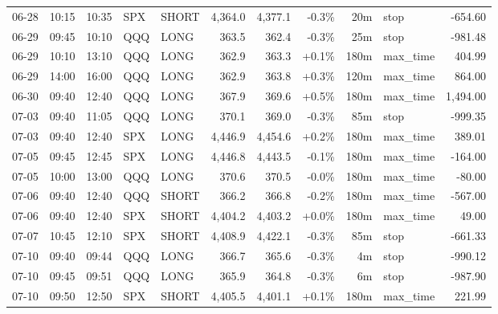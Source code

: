 \documentclass[11pt,a4paper,twoside]{article}
\begin{document}
\begin{center}
\begin{longtable}{>{\color{txtmain}}l l l l l r r r r >{\color{txtmain}}l r}
06-28 & 10:15 & 10:35 & SPX & SHORT & 4,364.0 & 4,377.1 & \textcolor{lossred}{-0.3\%} & 20m & stop & \textcolor{lossred}{-654.60} \\
06-29 & 09:45 & 10:10 & QQQ & LONG & 363.5 & 362.4 & \textcolor{lossred}{-0.3\%} & 25m & stop & \textcolor{lossred}{-981.48} \\
06-29 & 10:10 & 13:10 & QQQ & LONG & 362.9 & 363.3 & \textcolor{wingreen}{+0.1\%} & 180m & max\_time & \textcolor{wingreen}{404.99} \\
06-29 & 14:00 & 16:00 & QQQ & LONG & 362.9 & 363.8 & \textcolor{wingreen}{+0.3\%} & 120m & max\_time & \textcolor{wingreen}{864.00} \\
06-30 & 09:40 & 12:40 & QQQ & LONG & 367.9 & 369.6 & \textcolor{wingreen}{+0.5\%} & 180m & max\_time & \textcolor{wingreen}{1,494.00} \\
07-03 & 09:40 & 11:05 & QQQ & LONG & 370.1 & 369.0 & \textcolor{lossred}{-0.3\%} & 85m & stop & \textcolor{lossred}{-999.35} \\
07-03 & 09:40 & 12:40 & SPX & LONG & 4,446.9 & 4,454.6 & \textcolor{wingreen}{+0.2\%} & 180m & max\_time & \textcolor{wingreen}{389.01} \\
07-05 & 09:45 & 12:45 & SPX & LONG & 4,446.8 & 4,443.5 & \textcolor{lossred}{-0.1\%} & 180m & max\_time & \textcolor{lossred}{-164.00} \\
07-05 & 10:00 & 13:00 & QQQ & LONG & 370.6 & 370.5 & \textcolor{lossred}{-0.0\%} & 180m & max\_time & \textcolor{lossred}{-80.00} \\
07-06 & 09:40 & 12:40 & QQQ & SHORT & 366.2 & 366.8 & \textcolor{lossred}{-0.2\%} & 180m & max\_time & \textcolor{lossred}{-567.00} \\
07-06 & 09:40 & 12:40 & SPX & SHORT & 4,404.2 & 4,403.2 & \textcolor{wingreen}{+0.0\%} & 180m & max\_time & \textcolor{wingreen}{49.00} \\
07-07 & 10:45 & 12:10 & SPX & SHORT & 4,408.9 & 4,422.1 & \textcolor{lossred}{-0.3\%} & 85m & stop & \textcolor{lossred}{-661.33} \\
07-10 & 09:40 & 09:44 & QQQ & LONG & 366.7 & 365.6 & \textcolor{lossred}{-0.3\%} & 4m & stop & \textcolor{lossred}{-990.12} \\
07-10 & 09:45 & 09:51 & QQQ & LONG & 365.9 & 364.8 & \textcolor{lossred}{-0.3\%} & 6m & stop & \textcolor{lossred}{-987.90} \\
07-10 & 09:50 & 12:50 & SPX & SHORT & 4,405.5 & 4,401.1 & \textcolor{wingreen}{+0.1\%} & 180m & max\_time & \textcolor{wingreen}{221.99} \\

\end{longtable}
\end{center}
\end{document}
